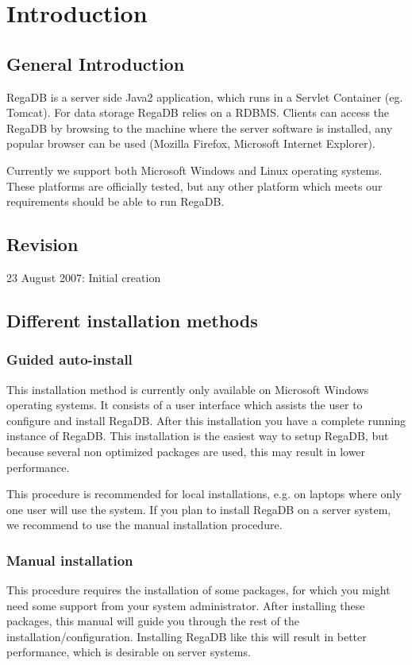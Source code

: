 \chapter{Introduction}
\label{chapter:introduction}

\section{General Introduction}

RegaDB is a server side Java2 application, which runs in a Servlet Container (eg. Tomcat). For data storage RegaDB relies on a RDBMS. Clients can access the RegaDB by browsing to the machine where the server software is installed, any popular browser can be used (Mozilla Firefox, Microsoft Internet Explorer).

Currently we support both Microsoft Windows and Linux operating systems. These platforms are officially tested, but any other platform which meets our requirements should be able to run RegaDB.

\section{Revision}
23 August 2007: Initial creation

\section{Different installation methods}
\subsection{Guided auto-install}
This installation method is currently only available on Microsoft Windows operating systems. It consists of a user interface which assists the user to configure and install RegaDB. After this installation you have a complete running instance of RegaDB. This installation is the easiest way to setup RegaDB, but because several non optimized packages are used, this may result in lower performance.

This procedure is recommended for local installations, e.g. on laptops where only one user will use the system. If you plan to install RegaDB on a server system, we recommend to use the manual installation procedure.

\subsection{Manual installation}
This procedure requires the installation of some packages, for which you might need some support from your system administrator. After installing these packages, this manual will guide you through the rest of the installation/configuration. Installing RegaDB like this will result in better performance, which is desirable on server systems.

